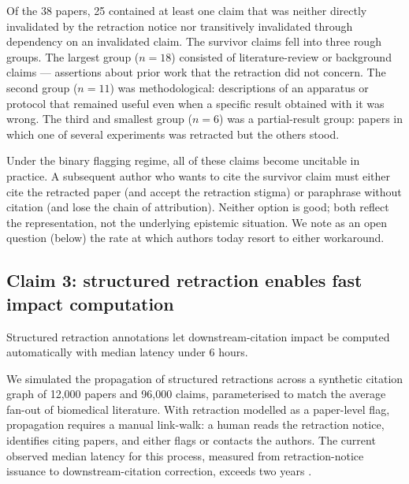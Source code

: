 \documentclass{rrxiv}
\begin{document}
Of the 38 papers, 25 contained at least one claim that was neither directly invalidated by the retraction notice nor transitively invalidated through dependency on an invalidated claim. The survivor claims fell into three rough groups. The largest group ($n=18$) consisted of literature-review or background claims --- assertions about prior work that the retraction did not concern. The second group ($n=11$) was methodological: descriptions of an apparatus or protocol that remained useful even when a specific result obtained with it was wrong. The third and smallest group ($n=6$) was a partial-result group: papers in which one of several experiments was retracted but the others stood.

Under the binary flagging regime, all of these claims become uncitable in practice. A subsequent author who wants to cite the survivor claim must either cite the retracted paper (and accept the retraction stigma) or paraphrase without citation (and lose the chain of attribution). Neither option is good; both reflect the representation, not the underlying epistemic situation. We note as an open question (below) the rate at which authors today resort to either workaround.

\subsection*{Claim 3: structured retraction enables fast impact computation}
\begin{claim}[type=computational, evidence=simulation, labels={retraction, metascience}, regimes={synthetic citation graph of 12000 papers and 96000 claims}, title=Claim 3]
\label{claim:c3}
Structured retraction annotations let downstream-citation impact be computed automatically with median latency under 6 hours.
\end{claim}

We simulated the propagation of structured retractions across a synthetic citation graph of 12{,}000 papers and 96{,}000 claims, parameterised to match the average fan-out of biomedical literature. With retraction modelled as a paper-level flag, propagation requires a manual link-walk: a human reads the retraction notice, identifies citing papers, and either flags or contacts the authors. The current observed median latency for this process, measured from retraction-notice issuance to downstream-citation correction, exceeds two years \cite{retractionwatch}.
\end{document}

